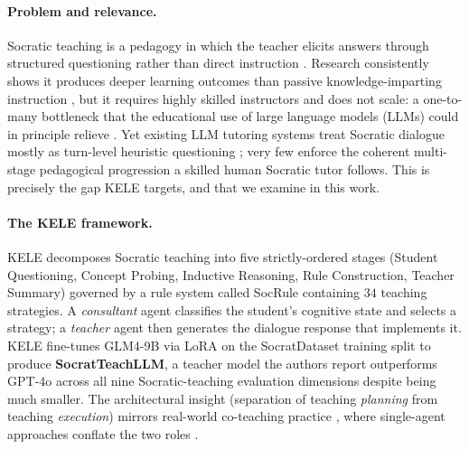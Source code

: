 \documentclass[11pt]{article}
\begin{document}
\paragraph{Problem and relevance.} Socratic teaching is a pedagogy in which the teacher elicits answers through structured questioning rather than direct instruction \citep{seeskin1987socratic,chang1998socratic}. Research consistently shows it produces deeper learning outcomes than passive knowledge-imparting instruction \citep{johnston1994teaching,knezic2010socratic}, but it requires highly skilled instructors and does not scale: a one-to-many bottleneck that the educational use of large language models (LLMs) could in principle relieve \citep{kasneci2023chatgpt,gan2023llmedu,sonkar2023class}. Yet existing LLM tutoring systems treat Socratic dialogue mostly as turn-level heuristic questioning \citep{alhossami2024socratic,shridhar2022mathword,zhang2024spl,dan2023educhat,liu2024socraticLM,ding2024socraticmath,macina2023mathdial}; very few enforce the coherent multi-stage pedagogical progression a skilled human Socratic tutor follows. This is precisely the gap KELE \citep{peng2025kele} targets, and that we examine in this work.

\paragraph{The KELE framework.} KELE decomposes Socratic teaching into five strictly-ordered stages (Student Questioning, Concept Probing, Inductive Reasoning, Rule Construction, Teacher Summary) governed by a rule system called SocRule containing $34$ teaching strategies. A \emph{consultant} agent classifies the student's cognitive state and selects a strategy; a \emph{teacher} agent then generates the dialogue response that implements it. KELE fine-tunes GLM4-9B \citep{glm2024chatglm} via LoRA \citep{hu2022lora} on the SocratDataset training split to produce \textbf{SocratTeachLLM}, a teacher model the authors report outperforms GPT-4o \citep{openai2024gpt4o} across all nine Socratic-teaching evaluation dimensions despite being much smaller. The architectural insight (separation of teaching \emph{planning} from teaching \emph{execution}) mirrors real-world co-teaching practice \citep{nevin2009collaborative}, where single-agent approaches conflate the two roles \citep{ge2023openagi,an2024llmcontext}.
\end{document}

